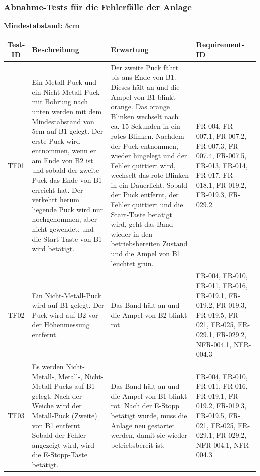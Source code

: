 \documentclass[oneside,a4paper,titlepage]{scrartcl}              %
\begin{document}
\newpage

\subsubsection{Abnahme-Tests für die Fehlerfälle der Anlage}
\textbf{Mindestabstand: 5cm}
\begin{small}
  \begin{center}
    \begin{longtable}{|c|p{4cm}|p{6cm}|C{3cm}|}
      \hline
      \textbf{Test-ID} & \textbf{Beschreibung} & \textbf{Erwartung} & \textbf{Requirement-ID}\\
      \toprule
      \endhead
      \hline
      TF01 & Ein Metall-Puck und ein Nicht-Metall-Puck mit Bohrung nach unten werden mit dem Mindestabstand von 5cm auf B1 gelegt. Der erste Puck wird entnommen, wenn er am Ende von B2 ist und sobald der zweite Puck das Ende von B1 erreicht hat. Der verkehrt herum liegende Puck wird nur hochgenommen, aber nicht gewendet, und die Start-Taste von B1 wird betätigt. & Der zweite Puck fährt bis ans Ende von B1. Dieses hält an und die Ampel von B1 blinkt orange. Das orange Blinken wechselt nach ca. 15 Sekunden in ein rotes Blinken. Nachdem der Puck entnommen, wieder hingelegt und der Fehler quittiert wird, wechselt das rote Blinken in ein Dauerlicht. Sobald der Puck entfernt, der Fehler quittiert und die Start-Taste betätigt wird, geht das Band wieder in den betriebsbereiten Zustand und die Ampel von B1 leuchtet grün. & FR-004, FR-007.1, FR-007.2, FR-007.3, FR-007.4, FR-007.5, FR-013, FR-014, FR-017, FR-018.1, FR-019.2, FR-019.3, FR-029.2\\
      \hline
       TF02 & Ein Nicht-Metall-Puck wird auf B1 gelegt. Der Puck wird auf B2 vor der Höhenmessung entfernt. & Das Band hält an und die Ampel von B2 blinkt rot. & FR-004, FR-010, FR-011, FR-016, FR-019.1, FR-019.2, FR-019.3, FR-019.5, FR-021, FR-025, FR-029.1, FR-029.2, NFR-004.1, NFR-004.3\\
      \hline
      TF03 & Es werden Nicht-Metall-, Metall-, Nicht-Metall-Pucks auf B1 gelegt. Nach der Weiche wird der Metall-Puck (Zweite) von B1 entfernt. Sobald der Fehler angezeigt wird, wird die E-Stopp-Taste betätigt. & Das Band hält an und die Ampel von B1 blinkt rot. Nach der E-Stopp betätigt wurde, muss die Anlage neu gestartet werden, damit sie wieder betriebsbereit ist. & FR-004, FR-010, FR-011, FR-016, FR-019.1, FR-019.2, FR-019.3, FR-019.5, FR-021, FR-025, FR-029.1, FR-029.2, NFR-004.1, NFR-004.3\\

\end{longtable}
\end{center}
\end{small}
\end{document}
